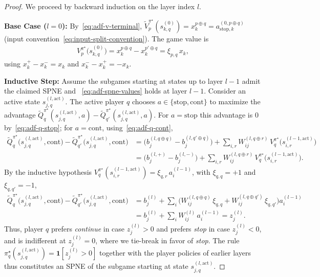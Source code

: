 \documentclass[twoside]{article}
\newcommand{\1}{\mathbf{1}}
\begin{document}
\begin{proof}
We proceed by backward induction on the layer index $l$.

\textbf{Base Case ($l=0$):} By~\eqref{eq:adf-v-terminal}, $\tilde{V}_p^{\pi^\star}(s_{k,q}^{(0)}) =
    x_k^{p \oplus q} = a_{\mathrm{stop},k}^{(0, p \oplus q)}$ (input
convention~\eqref{eq:input-split-convention}). The game value is
\begin{align}
    V_p^{\pi^\star}\bigl(s_{k,q}^{(0)}\bigr)
    = x_k^{p \oplus q} - x_k^{p' \oplus q}
    = \xi_{p,q}\, x_k,
\end{align}
using $x_k^+ - x_k^- = x_k$ and $x_k^- - x_k^+ = -x_k$.

\textbf{Inductive Step:} Assume the subgames starting at states up to layer $l-1$ admit the claimed
SPNE and ~\eqref{eq:adf-spne-values} holds at layer $l-1$. Consider an active state $s_{j,q}^{(l,
    \mathrm{act})}$. The active player $q$ chooses $a \in \{\mathrm{stop}, \mathrm{cont}\}$ to maximize
the advantage $\tilde{Q}_q^{\pi^\star}(s_{j,q}^{(l, \mathrm{act})}, a) -
    \tilde{Q}_{q'}^{\pi^\star}(s_{j,q}^{(l, \mathrm{act})}, a)$. For $a=\mathrm{stop}$ this advantage
is $0$ by~\eqref{eq:adf-q-stop}; for $a=\mathrm{cont}$, using~\eqref{eq:adf-q-cont},
\begin{align}
    \tilde{Q}_q^{\pi^\star}\bigl(s_{j,q}^{(l, \mathrm{act})}, \mathrm{cont}\bigr) -
    \tilde{Q}_{q'}^{\pi^\star}\bigl(s_{j,q}^{(l, \mathrm{act})}, \mathrm{cont}\bigr)
    &= \bigl(b_j^{(l, q \oplus q)} - b_j^{(l, q' \oplus q)}\bigr) + \sum_{i,r} W_{ij}^{(l, q \oplus
    r)}\, V_q^{\pi^\star}\bigl(s_{i,r}^{(l-1, \mathrm{act})}\bigr) \\
    &= \bigl(b_j^{(l,+)} - b_j^{(l,-)}\bigr) + \sum_{i,r} W_{ij}^{(l, q \oplus r)}\,
    V_q^{\pi^\star}\bigl(s_{i,r}^{(l-1, \mathrm{act})}\bigr).
\end{align}
By the inductive hypothesis $V_q^{\pi^\star}(s_{i,r}^{(l-1, \mathrm{act})}) = \xi_{q,r}\,
    a_i^{(l-1)}$, with $\xi_{q,q}=+1$ and $\xi_{q,q'}=-1$,
\begin{align}
    \tilde{Q}_q^{\pi^\star}\bigl(s_{j,q}^{(l, \mathrm{act})}, \mathrm{cont}\bigr) -
    \tilde{Q}_{q'}^{\pi^\star}\bigl(s_{j,q}^{(l, \mathrm{act})}, \mathrm{cont}\bigr)
    &= b_j^{(l)} + \sum_i \bigl( W_{ij}^{(l, q \oplus q)}\, \xi_{q,q} + W_{ij}^{(l, q \oplus q')}\,
    \xi_{q,q'} \bigr) a_i^{(l-1)} \\
    &= b_j^{(l)} + \sum_i W_{ij}^{(l)}\, a_i^{(l-1)} = z_j^{(l)}.
\end{align}
Thus, player $q$ prefers \emph{continue} in case $z_j^{(l)} > 0$ and prefers \emph{stop} in case
$z_j^{(l)} < 0$, and is indifferent at $z_j^{(l)} = 0$, where we tie-break in favor of \emph{stop}.
The rule $\pi_q^\star(s_{j,q}^{(l, \mathrm{act})}) = \1[z_j^{(l)} > 0]$ together with the player
policies of earlier layers thus constitutes an SPNE of the subgame starting at state $s_{j,q}^{(l
    ,\text{act})}$.


\end{proof}
\end{document}
